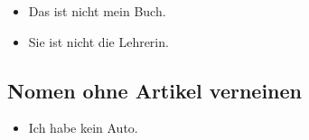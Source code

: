 \documentclass[a4paper]{article}
\begin{document}
        \begin{itemize}
            \item Das ist nicht mein Buch.
            \item Sie ist nicht die Lehrerin.
        \end{itemize}
    
    \subsection{Nomen ohne Artikel verneinen}
        
        \begin{itemize}
            \item Ich habe kein Auto.
        \end{itemize}
    
    
\end{document}
